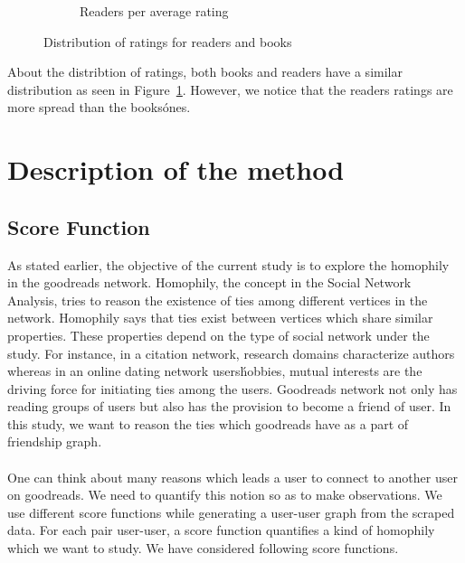 \documentclass[11pt]{article}
\begin{document}
\begin{figure}
\begin{subfigure}[b]{0.5\textwidth}
                \caption{Readers per average rating}
        \end{subfigure}
        \caption{Distribution of ratings for readers and books}
        \label{fig:scatters}
\end{figure}

About the distribtion of ratings, both books and readers have a similar distribution as seen in Figure~\ref{fig:scatters}. However, we notice that the readers ratings are more spread than the books\' ones.


\section{Description of the method}
\label{sec:method}
\subsection{Score Function}
As stated earlier, the objective of the current study is to explore the homophily in the goodreads network.
Homophily, the concept in the Social Network Analysis, tries to reason the existence of ties among different vertices in the network.
Homophily says that ties exist between vertices which share similar properties.
These properties depend on the type of social network under the study.
For instance, in a citation network, research domains characterize authors whereas in an online dating network users\' hobbies, mutual interests are the driving force for initiating ties among the users. Goodreads network not only has reading groups of users but also has the provision to become a friend of user.
In this study, we want to reason the ties which goodreads have as a part of friendship graph.\\\\
One can think about many reasons which leads a user to connect to another user on goodreads.
We need to quantify this notion so as to make observations.
We use different score functions while generating a user-user graph from the scraped data.
For each pair user-user, a score function quantifies a kind of homophily which we want to study.
We have considered following score functions.
\end{document}
